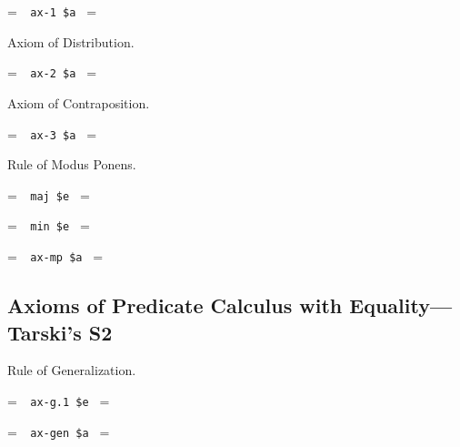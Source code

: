 \setbox\startprefix=\hbox{\tt \ \ ax-1\ \$a\ }
\setbox\contprefix=\hbox{\tt \ \ \ \ \ \ \ \ \ \ }
\startm
\m{\vdash}\m{(}\m{\varphi}\m{\rightarrow}\m{(}\m{\psi}\m{\rightarrow}\m{\varphi}\m{)}
\m{)}
\endm

\noindent Axiom of Distribution.

\setbox\startprefix=\hbox{\tt \ \ ax-2\ \$a\ }
\setbox\contprefix=\hbox{\tt \ \ \ \ \ \ \ \ \ \ }
\startm
\m{\vdash}\m{(}\m{(}\m{\varphi}\m{\rightarrow}\m{(}\m{\psi}\m{\rightarrow}\m{\chi}
\m{)}\m{)}\m{\rightarrow}\m{(}\m{(}\m{\varphi}\m{\rightarrow}\m{\psi}\m{)}\m{
\rightarrow}\m{(}\m{\varphi}\m{\rightarrow}\m{\chi}\m{)}\m{)}\m{)}
\endm

\noindent Axiom of Contraposition.

\setbox\startprefix=\hbox{\tt \ \ ax-3\ \$a\ }
\setbox\contprefix=\hbox{\tt \ \ \ \ \ \ \ \ \ \ }
\startm
\m{\vdash}\m{(}\m{(}\m{\lnot}\m{\varphi}\m{\rightarrow}\m{\lnot}\m{\psi}\m{)}\m{
\rightarrow}\m{(}\m{\psi}\m{\rightarrow}\m{\varphi}\m{)}\m{)}
\endm


\noindent Rule of Modus Ponens.\label{axmp}

\setbox\startprefix=\hbox{\tt \ \ maj\ \$e\ }
\setbox\contprefix=\hbox{\tt \ \ \ \ \ \ \ \ \ }
\startm
\m{\vdash}\m{(}\m{\varphi}\m{\rightarrow}\m{\psi}\m{)}
\endm

\setbox\startprefix=\hbox{\tt \ \ min\ \$e\ }
\setbox\contprefix=\hbox{\tt \ \ \ \ \ \ \ \ \ }
\startm
\m{\vdash}\m{\varphi}
\endm

\setbox\startprefix=\hbox{\tt \ \ ax-mp\ \$a\ }
\setbox\contprefix=\hbox{\tt \ \ \ \ \ \ \ \ \ \ \ }
\startm
\m{\vdash}\m{\psi}
\endm


\subsection{Axioms of Predicate Calculus with Equality---Tarski's S2}

\noindent Rule of Generalization.

\setbox\startprefix=\hbox{\tt \ \ ax-g.1\ \$e\ }
\setbox\contprefix=\hbox{\tt \ \ \ \ \ \ \ \ \ \ \ \ }
\startm
\m{\vdash}\m{\varphi}
\endm

\setbox\startprefix=\hbox{\tt \ \ ax-gen\ \$a\ }
\setbox\contprefix=\hbox{\tt \ \ \ \ \ \ \ \ \ \ \ \ }
\startm
\m{\vdash}\m{\forall}\m{\varphi}
\endm

